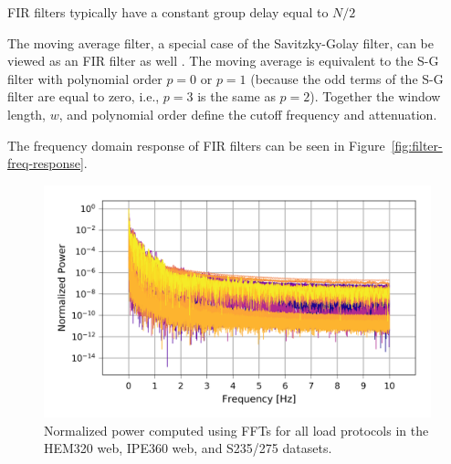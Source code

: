 \documentclass[a4paper,11pt]{article}
\begin{document}
FIR filters typically have a constant group delay equal to $N / 2$

The moving average filter, a special case of the Savitzky-Golay filter, can be viewed as an FIR filter as well \citep{SchaferWhatSavitzkyGolayFilter2011}.
The moving average is equivalent to the S-G filter with polynomial order $p = 0$ or $p = 1$ (because the odd terms of the S-G filter are equal to zero, i.e., $p = 3$ is the same as $p = 2$).
Together the window length, $w$, and polynomial order define the cutoff frequency and attenuation.

The frequency domain response of FIR filters can be seen in Figure~\ref{fig:filter-freq-response}.

\begin{figure}
    \centering
    \includegraphics{frequency_power.png}
    \caption{Normalized power computed using FFTs for all load protocols in the HEM320 web, IPE360 web, and S235/275 datasets.}
    \label{fig:frequency-power}
\end{figure}
\end{document}
